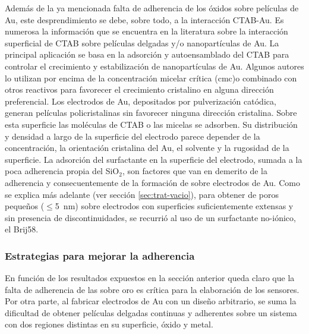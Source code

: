 			Además de la ya mencionada falta de adherencia de los óxidos sobre películas de Au, este desprendimiento se debe, sobre todo, a la interacción CTAB-Au. Es numerosa la información que se encuentra en la literatura sobre la interacción superficial de CTAB sobre películas delgadas y/o nanopartículas de Au. La principal aplicación se basa en la adsorción y autoensamblado del CTAB para controlar el crecimiento y estabilización de nanopartículas de Au. \cite{Cheng2003,Smith2008,Meena2013,Wang2013,Hamon2009} Algunos autores lo utilizan por encima de la concentración micelar crítica (cmc)\cite{Lim2014}o combinado con otros reactivos para favorecer el crecimiento cristalino en alguna dirección preferencial\cite{Smith2009}. Los electrodos de Au, depositados por pulverización catódica, generan películas policristalinas sin favorecer ninguna dirección cristalina.\cite{Svorcik2010,Bechelany2010} Sobre esta superficie las moléculas de CTAB o las micelas se adsorben. Su distribución y densidad a largo de la superficie del electrodo parece depender de la concentración, la orientación cristalina del Au, el solvente y la rugosidad de la superficie\cite{Meena2013,Lim2014}. La adsorción del surfactante en la superficie del electrodo, sumada a la poca adherencia propia del SiO$_2$, son factores que van en demerito de la adherencia y consecuentemente de la formación de \pdmC\space sobre electrodos de Au. %
			Como se explica más adelante (ver sección \ref{sec:trat-vacio}), para obtener \pdm\space de poros pequeños ($\leq$\SI{5}{\nm}) sobre electrodos con superficies suficientemente extensas y sin presencia de discontinuidades, se recurrió al uso de un surfactante no-iónico, el Brij58\index{Brij58}.
							
		\subsubsection{Estrategias para mejorar la adherencia}\label{sec:adherencia}

			 En función de los resultados expuestos en la sección anterior queda claro que la falta de adherencia de las \pdm\space sobre oro es crítica para la elaboración de los sensores. Por otra parte, al fabricar electrodos de Au con un diseño arbitrario, se suma la dificultad de obtener películas delgadas continuas y adherentes sobre un sistema con dos regiones distintas en su superficie, óxido y metal.
 
